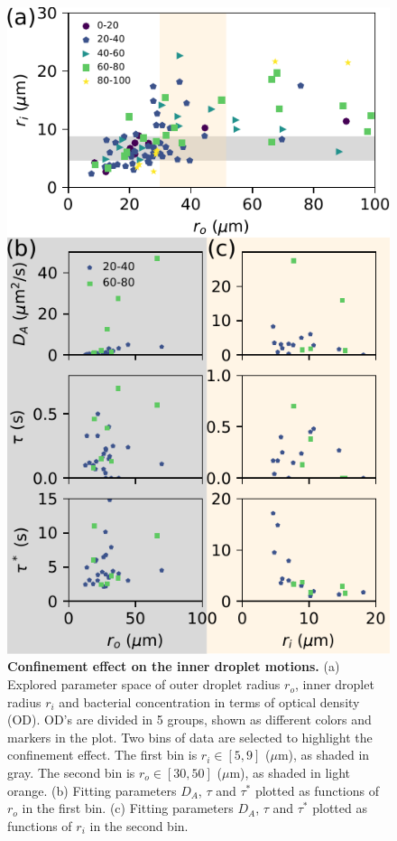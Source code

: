\documentclass[%
10pt,
superscriptaddress,
twocolumn,
 amsmath,amssymb,
 aps,prx,
]{revtex4-2}
\begin{document}
\begin{figure}[!t]
  \includegraphics[width=\columnwidth]{3-confinement-effect}
  \caption{
  \textbf{Confinement effect on the inner droplet motions.}
  (a) Explored parameter space of outer droplet radius $r_o$, inner droplet radius $r_i$ and bacterial concentration in terms of optical density (OD).
  OD's are divided in 5 groups, shown as different colors and markers in the plot.
  Two bins of data are selected to highlight the confinement effect.
  The first bin is $r_i\in[5, 9]$ ($\mu$m), as shaded in gray.
  The second bin is $r_o\in[30, 50]$ ($\mu$m), as shaded in light orange.
  (b) Fitting parameters $D_A$, $\tau$ and $\tau^*$ plotted as functions of $r_o$ in the first bin.
  (c) Fitting parameters $D_A$, $\tau$ and $\tau^*$ plotted as functions of $r_i$ in the second bin.
  }
  \label{fig:confinement-effect}
\end{figure}
\end{document}

